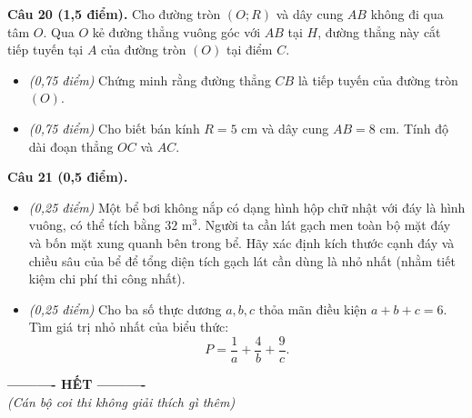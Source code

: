 \documentclass[11pt,a4paper]{article}
\begin{document}
\vspace{2mm}
\textbf{Câu 20 (1,5 điểm).} Cho đường tròn $(O; R)$ và dây cung $AB$ không đi qua tâm $O$. Qua $O$ kẻ đường thẳng vuông góc với $AB$ tại $H$, đường thẳng này cắt tiếp tuyến tại $A$ của đường tròn $(O)$ tại điểm $C$.
\begin{itemize}
  \item[a)] \textit{(0,75 điểm)} Chứng minh rằng đường thẳng $CB$ là tiếp tuyến của đường tròn $(O)$.
  \item[b)] \textit{(0,75 điểm)} Cho biết bán kính $R = 5\text{ cm}$ và dây cung $AB = 8\text{ cm}$. Tính độ dài đoạn thẳng $OC$ và $AC$.
\end{itemize}

\vspace{2mm}
\textbf{Câu 21 (0,5 điểm).}
\begin{itemize}
  \item[a)] \textit{(0,25 điểm)} Một bể bơi không nắp có dạng hình hộp chữ nhật với đáy là hình vuông, có thể tích bằng $32\text{ m}^3$. Người ta cần lát gạch men toàn bộ mặt đáy và bốn mặt xung quanh bên trong bể. Hãy xác định kích thước cạnh đáy và chiều sâu của bể để tổng diện tích gạch lát cần dùng là nhỏ nhất (nhằm tiết kiệm chi phí thi công nhất).
  \item[b)] \textit{(0,25 điểm)} Cho ba số thực dương $a, b, c$ thỏa mãn điều kiện $a + b + c = 6$. Tìm giá trị nhỏ nhất của biểu thức:
  \[
  P = \dfrac{1}{a} + \dfrac{4}{b} + \dfrac{9}{c}.
  \]
\end{itemize}

\vspace{4mm}
\begin{center}
\textbf{---------- HẾT ----------}\\
\textit{(Cán bộ coi thi không giải thích gì thêm)}
\end{center}
\end{document}
